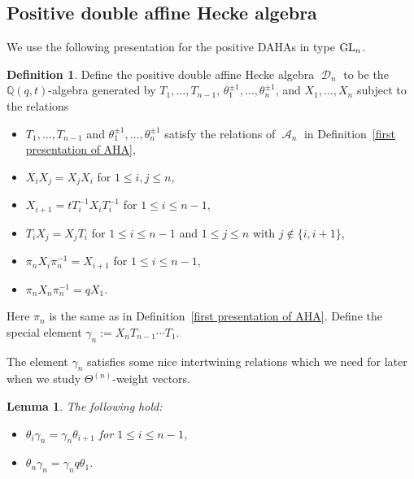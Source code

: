 \documentclass[pdftex]{sigma}
\numberwithin{equation}{section}
\newtheorem{Lemma}[Theorem]{Lemma}
\theoremstyle{definition}
\newtheorem{Definition}[Theorem]{Definition}
\DeclareMathOperator{\sA}{\mathscr{A}}
\DeclareMathOperator{\sD}{\mathscr{D}}
\begin{document}
\subsection{Positive double affine Hecke algebra}
We use the following presentation for the positive DAHAs in type ${\rm GL}_n$.
\begin{Definition}\label{daha def}
 Define the positive double affine Hecke algebra $\sD_n$ to be the $\mathbb{Q}(q,t)$-algebra generated by $T_1,\dots,T_{n-1}$, $\theta_1^{\pm 1},\dots, \theta_n^{\pm 1}$, and $X_1,\dots, X_n$ subject to the relations
 \begin{itemize}
\itemsep=0pt
 \item $T_1,\dots,T_{n-1}$ and $\theta_1^{\pm 1},\dots, \theta_n^{\pm 1}$ satisfy the relations of $\sA_n$ in Definition~\ref{first presentation of AHA},
 \item $X_iX_j = X_jX_i$ for $1\leq i,j \leq n$,
 \item $X_{i+1} = tT_i^{-1}X_iT_i^{-1}$ for $1\leq i \leq n-1$,
 \item $T_iX_j = X_jT_i$ for $1\leq i\leq n-1$ and $1\leq j \leq n$ with $j \notin \{i,i+1\}$,
 \item $\pi_nX_i\pi_n^{-1} = X_{i+1}$ for $1\leq i \leq n-1$,
 \item $\pi_nX_n\pi_n^{-1} = qX_1$.
 \end{itemize}
 Here $\pi_n$ is the same as in Definition~\ref{first presentation of AHA}. Define the special element $\gamma_n:= X_nT_{n-1}\cdots T_1$.
\end{Definition}

The element $\gamma_n$ satisfies some nice intertwining relations which we need for later when we study $\Theta^{(n)}$-weight vectors.

\begin{Lemma}\label{intertwiner Lemma}
 The following hold:
 \begin{itemize}
\itemsep=0pt
 \item $\theta_i\gamma_n = \gamma_n \theta_{i+1}$ for $1\leq i \leq n-1$,
 \item $\theta_n \gamma_n = \gamma_n q\theta_1$.
 \end{itemize}
\end{Lemma}
\end{document}

